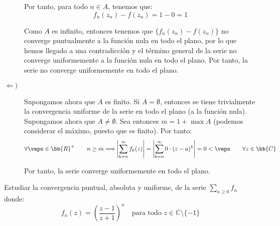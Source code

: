 \begin{ejercicio}
\begin{description}
        Por tanto, para todo $n\in A$, tenemos que:
        \begin{equation*}
            f_n(z_n)-f(z_n) = 1-0 = 1
        \end{equation*}

        Como $A$ es infinito, entonces tenemos que $\{f_n(z_n)-f(z_n)\}$ no converge puntualmente a la función nula en todo el plano, por lo que hemos llegado a una contradicción y el término general de la serie no converge uniformemente a la función nula en todo el plano. Por tanto, la serie no converge uniformemente en todo el plano.

        \item[$\Longleftarrow)$] Supongamos ahora que $A$ es finito. Si $A=\emptyset$, entonces se tiene trivialmente la convergencia uniforme de la serie en todo el plano (a la función nula). Supongamos ahora que $A\neq \emptyset$. Sea entonces $m=1+\max A$ (podemos considerar el máximo, puesto que es finito). Por tanto:
        \begin{equation*}
            \forall \veps\in \bb{R}^+\qquad n\geq m\Longrightarrow \left|\sum_{k=n}^\infty f_k(z)\right| = \left|\sum_{k=n}^\infty 0\cdot (z-a)^k\right| = 0 < \veps\qquad \forall z\in \bb{C}
        \end{equation*}

        Por tanto, la serie converge uniformemente en todo el plano.
    \end{description}
\end{ejercicio}

\begin{ejercicio}
    Estudiar la convergencia puntual, absoluta y uniforme, de la serie $\displaystyle \sum_{n \geq 0} f_n$ donde:
    \[
        f_n(z) = \left(\dfrac{z-1}{z+1}\right)^n \quad \text{para todo } z \in \mathbb{C}\setminus\{-1\}
    \]

\end{ejercicio}